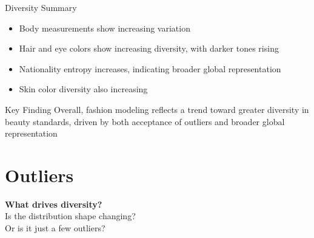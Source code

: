 \documentclass[aspectratio=169,xcolor=dvipsnames,10pt]{beamer}
\begin{document}


\begin{frame}{Diversity Summary} %
    \begin{itemize}
        \setlength{\itemsep}{0.6em}
        \pause \item Body measurements show increasing variation
        \pause \item Hair and eye colors show increasing diversity, with darker tones rising
        \pause \item Nationality entropy increases, indicating broader global representation
        \pause \item Skin color diversity also increasing
    \end{itemize}
    \pause
    \begin{block}{Key Finding}
        Overall, fashion modeling reflects a trend toward greater diversity in beauty standards, driven by both acceptance of outliers and broader global representation
    \end{block}
\end{frame}


        

\section{Outliers}
\begin{frame}
    \Large{
        \begin{center}
            \textbf{What drives diversity?} \\
            \vspace{1em}
            Is the distribution shape changing?\\
            \vspace{1em}
            Or is it just a few outliers?

        \end{center}
    }
\end{frame}
\end{document}
